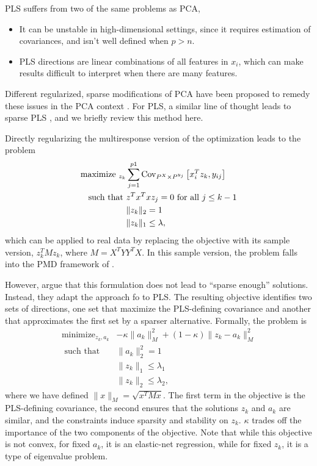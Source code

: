 \documentclass{article}
\begin{document}
PLS suffers from two of the same problems as PCA,
\begin{itemize}
\item It can be unstable in high-dimensional settings, since it requires
  estimation of covariances, and isn't well defined when $p > n$.
\item PLS directions are linear combinations of all features in $x_i$, which can
  make results difficult to interpret when there are many features.
\end{itemize}

Different regularized, sparse modifications of PCA have been proposed to remedy
these issues in the PCA context \citep{zou2006sparse, witten2009penalized}. For
PLS, a similar line of thought leads to sparse PLS \citep{chun2010sparse}, and
we briefly review this method here.

Directly regularizing the multiresponse version of the
optimization \label{eq:pls_obj} leads to the problem
\begin{align*}
  \text{maximize }_{z_k} &\sum_{j = 1}^{p1} \mathrm{Cov}_{P^X \times P^{y_j}}\left[{x_i^T z_k, y_{ij}}\right] \\
  \text{such that }&z^{T}x^{T}x z_{j} = 0 \text{ for all }j \leq k - 1 \\
  &\|z_k\|_2 = 1 \\
  &\|z_k\|_1 \leq \lambda,
\end{align*}
which can be applied to real data by replacing the objective with its sample
version, $z_k^{T} M z_k$, where $M = X^{T}YY^{T}X$. In this sample version, the
problem falls into the PMD framework of \citep{witten2009penalized}.

However, \cite{chun2010sparse} argue that this formulation does not lead to
``sparse enough'' solutions. Instead, they adapt the approach fo
\cite{zou2006sparse} to PLS. The resulting objective identifies two sets of
directions, one set that maximize the PLS-defining covariance and another that
approximates the first set by a sparser alternative. Formally, the problem is
\begin{align}
  \label{eq:spls_obj}
  \text{minimize}_{z_k, a_k} &-\kappa \|a_k\|_M^2 + \left(1 - \kappa\right) \|z_k - a_k\|_M^2 \\
  \text{ such that } & \|a_k\|_2^2 = 1 \nonumber \\
  &\|z_k\|_1 \leq \lambda_1 \nonumber \\
  &\|z_k\|_2 \leq \lambda_2, \nonumber
\end{align}
where we have defined $\|x\|_M = \sqrt{x^T M x}$. The first term in the
objective is the PLS-defining covariance, the second ensures that the solutions
$z_k$ and $a_k$ are similar, and the constraints induce sparsity and stability
on $z_k$. $\kappa$ trades off the importance of the two components of the
objective. Note that while this objective is not convex, for fixed $a_k$, it is
an elastic-net regression, while for fixed $z_k$, it is a type of eigenvalue
problem.
\end{document}
